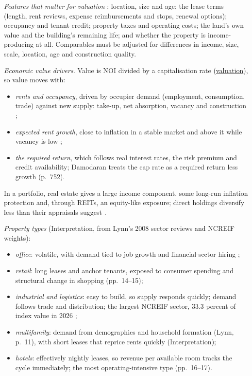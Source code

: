 \begin{qfmethod}\label{meth:real-estate-value-drivers}
 \emph{Features that matter for valuation} \citep[pp.~750--752, 759--761]{investment-valuation-2012}: location, size and age; the lease terms (length, rent reviews, expense reimbursements and stops, renewal options); occupancy and tenant credit; property taxes and operating costs; the land's own value and the building's remaining life; and whether the property is income-producing at all. Comparables must be adjusted for differences in income, size, scale, location, age and construction quality.

\emph{Economic value drivers.} Value is NOI divided by a capitalisation rate (\hyperref[meth:real-estate-valuation-indexes]{valuation}), so value moves with:
\begin{itemize}
\item \emph{rents and occupancy}, driven by occupier demand (employment, consumption, trade) against new supply: take-up, net absorption, vacancy and construction \citep[pp.~5--15]{tsolacos-real-estate-2021};
\item \emph{expected rent growth}, close to inflation in a stable market and above it while vacancy is low \citep[p.~751]{investment-valuation-2012};
\item \emph{the required return}, which follows real interest rates, the risk premium and credit availability; Damodaran treats the cap rate as a required return less growth (p.~752).
\end{itemize}
In a portfolio, real estate gives a large income component, some long-run inflation protection and, through REITs, an equity-like exposure; direct holdings diversify less than their appraisals suggest \citep[pp.~376--381]{s7-ang}.

\emph{Property types} (Interpretation, from Lynn's 2008 sector reviews and NCREIF weights):
\begin{itemize}
\item \emph{office}: volatile, with demand tied to job growth and financial-sector hiring \citep[p.~13]{lynn-real-estate-2009};
\item \emph{retail}: long leases and anchor tenants, exposed to consumer spending and structural change in shopping (pp.~14--15);
\item \emph{industrial and logistics}: easy to build, so supply responds quickly; demand follows trade and distribution; the largest NCREIF sector, 33.3 percent of index value in 2026 \citep[p.~1]{ncreif-npi-2026q2};
\item \emph{multifamily}: demand from demographics and household formation (Lynn, p.~11), with short leases that reprice rents quickly (Interpretation);
\item \emph{hotels}: effectively nightly leases, so revenue per available room tracks the cycle immediately; the most operating-intensive type (pp.~16--17).
\end{itemize}


\end{qfmethod}
